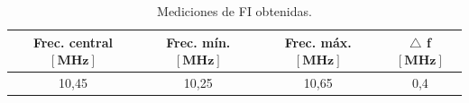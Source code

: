         \begin{table}[H]
            \small
            \centering
            \begin{tabular}{cccc}
                 \toprule
                 \textbf{Frec. central} $\mathbf{[MHz]}$ &  \textbf{Frec. mín.} $\mathbf{[MHz]}$ & 
                  \textbf{Frec. máx.} $\mathbf{[MHz]}$ &  $\mathbf{\triangle}$ \textbf{f} $\mathbf{[MHz]}$  \\ \midrule
                 10,45   &   10,25   & 10,65   & 0,4 \\ 
                 \bottomrule
            \end{tabular}
            \caption{Mediciones de FI obtenidas.}
            \label{tab:MedicionesFI}
        \end{table}
